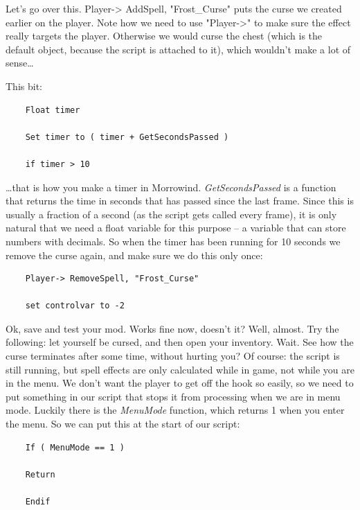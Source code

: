 

Let's go over this. Player-> AddSpell, "Frost\_Curse" puts the curse we created earlier on the player. Note how we need to use "Player->" to make sure the effect really targets the player. Otherwise we would curse the chest (which is the default object, because the script is attached to it), which wouldn't make a lot of sense\ldots{}


This bit:

\begin{lstlisting}
	Float timer
	
	Set timer to ( timer + GetSecondsPassed )
	
	if timer > 10
\end{lstlisting}

\ldots that is how you make a timer in Morrowind. \emph{GetSecondsPassed} is a function that returns the time in seconds that has passed since the last frame. Since this is usually a fraction of a second (as the script gets called every frame), it is only natural that we need a float variable for this purpose -- a variable that can store numbers with decimals. So when the timer has been running for 10 seconds we remove the curse again, and make sure we do this only once:


\begin{lstlisting}
	Player-> RemoveSpell, "Frost_Curse"
	
	set controlvar to -2
\end{lstlisting}

Ok, save and test your mod. Works fine now, doesn't it? Well, almost. Try the following: let yourself be cursed, and then open your inventory. Wait. See how the curse terminates after some time, without hurting you? Of course: the script is still running, but spell effects are only calculated while in game, not while you are in the menu. We don't want the player to get off the hook so easily, so we need to put something in our script that stops it from processing when we are in menu mode. Luckily there is the \emph{MenuMode} function, which returns 1 when you enter the menu. So we can put this at the start of our script:


\begin{lstlisting}
	If ( MenuMode == 1 )
	
	Return
	
	Endif
\end{lstlisting}

